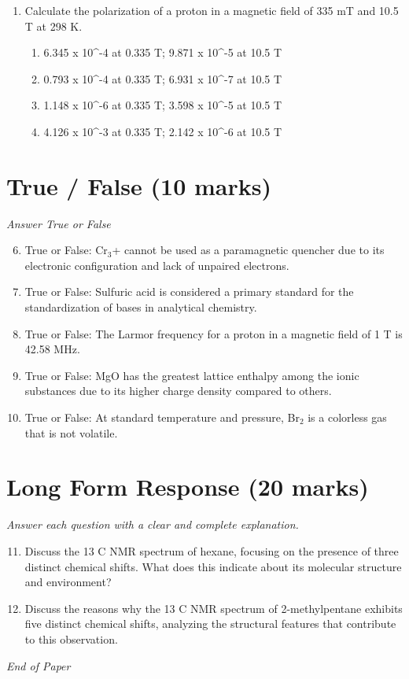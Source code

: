 \documentclass[12pt]{article}
\begin{document}
\begin{enumerate}[label=\arabic*.]
\begin{enumerate}[label=(\alph*)]
\end{enumerate}
\item Calculate the polarization of a proton in a magnetic field of 335 mT and 10.5 T at 298 K.
\begin{enumerate}[label=(\alph*)]
    \item 6.345 x 10^-4 at 0.335 T; 9.871 x 10^-5 at 10.5 T
    \item 0.793 x 10^-4 at 0.335 T; 6.931 x 10^-7 at 10.5 T
    \item 1.148 x 10^-6 at 0.335 T; 3.598 x 10^-5 at 10.5 T
    \item 4.126 x 10^-3 at 0.335 T; 2.142 x 10^-6 at 10.5 T
\end{enumerate}
\end{enumerate}

\section*{True / False (10 marks)}
\textit{Answer True or False}
\begin{enumerate}[label=\arabic*.]
\setcounter{enumi}{5}
\item True or False: Cr$_{3}$+ cannot be used as a paramagnetic quencher due to its electronic configuration and lack of unpaired electrons.
\item True or False: Sulfuric acid is considered a primary standard for the standardization of bases in analytical chemistry.
\item True or False: The Larmor frequency for a proton in a magnetic field of 1 T is 42.58 MHz.
\item True or False: MgO has the greatest lattice enthalpy among the ionic substances due to its higher charge density compared to others.
\item True or False: At standard temperature and pressure, Br$_{2}$ is a colorless gas that is not volatile.
\end{enumerate}

\section*{Long Form Response (20 marks)}
\textit{Answer each question with a clear and complete explanation.}
\begin{enumerate}[label=\arabic*.]
\setcounter{enumi}{10}
\item Discuss the 13 C NMR spectrum of hexane, focusing on the presence of three distinct chemical shifts. What does this indicate about its molecular structure and environment?
\item Discuss the reasons why the 13 C NMR spectrum of 2-methylpentane exhibits five distinct chemical shifts, analyzing the structural features that contribute to this observation.
\end{enumerate}

\vfill
\noindent\textit{End of Paper}
\end{document}
